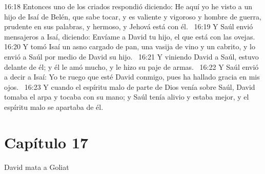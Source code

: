 16:18 Entonces uno de los criados respondió diciendo: He aquí yo he visto a un hijo de Isaí de Belén, que sabe tocar, y es valiente y vigoroso y hombre de guerra, prudente en sus palabras, y hermoso, y Jehová está con él.  
16:19 Y Saúl envió mensajeros a Isaí, diciendo: Envíame a David tu hijo, el que está con las ovejas.  
16:20 Y tomó Isaí un asno cargado de pan, una vasija de vino y un cabrito, y lo envió a Saúl por medio de David su hijo.  
16:21 Y viniendo David a Saúl, estuvo delante de él; y él le amó mucho, y le hizo su paje de armas.  
16:22 Y Saúl envió a decir a Isaí: Yo te ruego que esté David conmigo, pues ha hallado gracia en mis ojos.  
16:23 Y cuando el espíritu malo de parte de Dios venía sobre Saúl, David tomaba el arpa y tocaba con su mano; y Saúl tenía alivio y estaba mejor, y el espíritu malo se apartaba de él.  
\section*{Capítulo 17}
David mata a Goliat  

